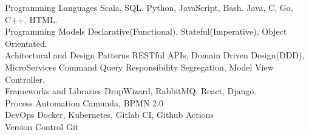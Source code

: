 

\begin{cvskills}
  \cvskill
    {Programming Languages} %
    {  Scala, SQL.} 
  \cvskill
    {} %
    {  Python, JavaScript, Bash. } 
  \cvskill
    {} %
    {  Java, C, Go, C++, HTML.} 
  \\
  \cvskill
    {Programming Models} %
    { Declarative(Functional), Stateful(Imperative), Object Orientated.} 
  \\
  \cvskill
    {Achitectural and Design Patterns} %
    {  RESTful APIs, Domain Driven Design(DDD), MicroServices}
    \cvskill
    {} %
    {  Command Query Responsibility Segregation, Model View Controller.} 
  \\
  \cvskill
    {Frameworks and Libraries} %
    {  DropWizard, RabbitMQ.} 
  \cvskill
    {} %
    {  React, Django.} 
  \\
  \cvskill
    {Process Automation}
    { Camunda, BPMN 2.0}
  \\
  \cvskill
    {DevOps} %
    { Docker, Kubernetes, Gitlab CI, Github Actions} %
  \\
  \cvskill
  {Version Control} %
  { Git} %

\end{cvskills}
